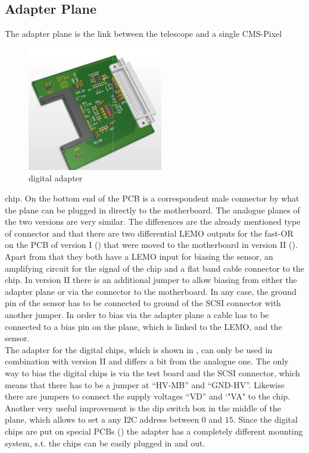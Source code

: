 \documentclass[british,11pt,a4paper]{memoir}
\begin{document}
\subsection{Adapter Plane}\label{s211}
The adapter plane is the link between the telescope and a single \ac{CMS}-Pixel
\begin{figure}
	\includegraphics[width=5.9cm]{adapterDig}
	\caption{digital adapter}
	\label{p6}
\end{figure}
chip. On the bottom end of the PCB is a correspondent male connector by what the plane can be plugged in directly to the motherboard. The analogue planes of the two versions are very similar. The differences are the already mentioned type of  connector and that there are two differential LEMO outputs for the fast-OR on the PCB of version I () that were moved to the motherboard in version II (). Apart from that they both have a LEMO input for biasing the sensor, an amplifying circuit for the signal of the chip and a flat band cable connector to the chip. In version II there is an additional jumper to allow biasing from either the adapter plane or via the connector to the motherboard. In any case, the ground pin of the sensor has to be connected to ground of the SCSI connector with another jumper. In order to bias via the adapter plane a cable has to be connected to a bias pin on the plane, which is linked to the LEMO, and the sensor.\\
The adapter for the digital chips, which is shown in , can only be used in combination with version II and differs a bit from the analogue one. The only way to bias the digital chips is via the test board and the SCSI connector, which means that there has to be a jumper at ``HV-MB'' and ``GND-HV''. Likewise there are jumpers to connect the supply voltages ``VD'' and `"VA" to the chip. Another very useful improvement is the dip switch box in the middle of the plane, which allows to set a any I2C address between $0$ and $15$. Since the digital chips are put on special PCBs () the adapter has a completely different mounting system, s.t. the chips can be easily plugged in and out.
\end{document}
